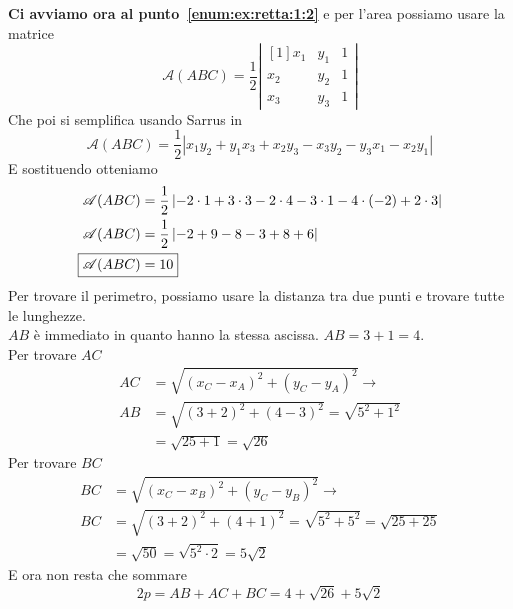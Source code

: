 \textbf{Ci avviamo ora al punto~\ref{enum:ex:retta:1:2}} e per l'area possiamo usare la matrice
\begin{equation*}
  \mathscr{A}(ABC) = \frac{1}{2}\left\lvert 
    \begin{matrix}[1]
      x_1 & y_1 & 1\\
      x_2 & y_2 & 1\\
      x_3 & y_3 & 1
  \end{matrix}\right\rvert
\end{equation*}
Che poi si semplifica usando Sarrus in
\begin{equation*}
  \mathscr{A}(ABC) = \frac{1}{2}\left\lvert x_1y_2 + y_1x_3 + x_2y_3 -x_3y_2 -y_3x_1 -x_2y_1\right\rvert
\end{equation*}
E sostituendo otteniamo
\begin{align*}
  \mathscr{A}(ABC) &= \frac{1}{2}\left\lvert -2\cdot1 + 3\cdot3 -2\cdot4 -3\cdot1 - 4\cdot(-2) +
  2\cdot3\right\rvert\\
  \mathscr{A}(ABC) &= \frac{1}{2}\left\lvert -2+9-8-3+8+6\right\rvert\\
  \Aboxed{\mathscr{A}(ABC) &= 10}
\end{align*}
Per trovare il perimetro, possiamo usare la distanza tra due punti e trovare tutte le lunghezze.\\
$AB$ è immediato in quanto hanno la stessa ascissa. $\boxed{AB = 3 + 1 = 4}$.\\ [\baselineskip]
Per trovare $AC$
\begin{align*}
  AC &= \sqrt{(x_C-x_A)^2+(y_C-y_A)^2} \rightarrow \\
  AB &= \sqrt{(3+2)^2 + (4-3)^2} = \sqrt{5^2+1^2} \\
     &= \sqrt{25+1} = \boxed{\sqrt{26}}
\end{align*}
Per trovare $BC$
\begin{align*}
  BC &= \sqrt{(x_C-x_B)^2+(y_C-y_B)^2} \rightarrow \\
  BC &= \sqrt{(3+2)^2+(4+1)^2} = \sqrt{5^2+5^2} =
  \sqrt{25+25} \\
  &= \sqrt{50} = \sqrt{5^2\cdot2} = \boxed{5\sqrt{2}}
\end{align*}
E ora non resta che sommare
\begin{equation*}
  2p = AB + AC + BC = 4 + \sqrt{26} + 5\sqrt{2}
\end{equation*}

